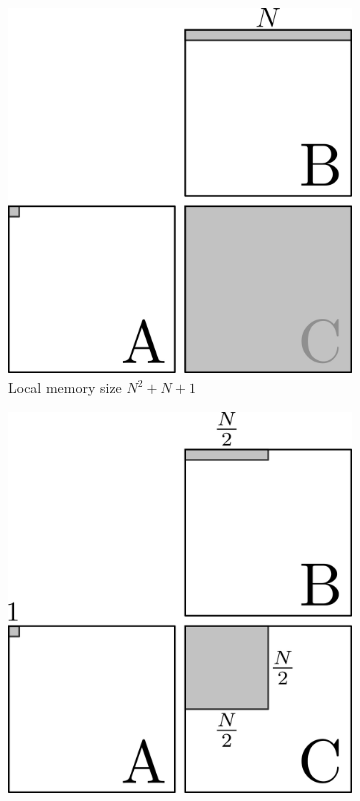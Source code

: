 \documentclass[a4 paper]{article}
\begin{document}
\begin{figure}[H]
\centering
\begin{subfigure}{.5\textwidth}
  \centering
  \includegraphics[scale=1]{figures/outer_mmm_n2.png}
  \caption{Local memory size $N^2 + N + 1$}
  \label{fig:outermm_n2}
\end{subfigure}%
\begin{subfigure}{.5\textwidth}
  \centering
  \includegraphics[scale=1]{figures/outer_mmm_n2_4.png}

\end{subfigure}
\end{figure}
\end{document}
